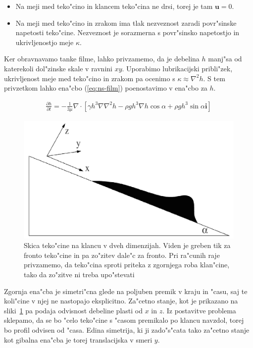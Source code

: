 \documentclass[a4paper,12pt]{article}
\renewcommand{\vec}{\mathbf}
\begin{document}
\begin{itemize}
 \item Na meji med teko"cino in klancem teko"cina ne drsi, torej je tam $\vec u = 0$. 
 \item Na meji med teko"cino in zrakom ima tlak nezveznost zaradi povr"sinske napetosti teko"cine. Nezveznost je sorazmerna s povr"sinsko napetostjo in ukrivljenostjo meje $\kappa$. 
\end{itemize}

Ker obravnavamo tanke filme, lahko privzamemo, da je debelina $h$ manj"sa od katerekoli dol"zinske skale v ravnini $xy$. Uporabimo lubrikacijski pribli"zek, ukrivljenost meje med teko"cino in zrakom pa ocenimo s $\kappa \approx \nabla^2 h$. S tem privzetkom lahko ena"cbo (\ref{eq:ns-film}) poenostavimo v ena"cbo za $h$. 

\begin{align}
\label{eq:ns-film-h}
 \frac{\partial h}{\partial t} = -\frac{1}{3\mu}\nabla \cdot \left[ \gamma h^3 \nabla \nabla^2 h - \rho g h^3 \nabla h \cos \alpha + \rho g h^3 \sin \alpha \vec i \right]
\end{align}

\begin{figure}[h]
\centering
 \includegraphics[width=.8\textwidth]{./Slike/film-skica}
\caption{Skica teko"cine na klancu v dveh dimenzijah. Viden je greben tik za fronto teko"cine in pa zo"zitev dale"c za fronto. Pri ra"cunih raje privzamemo, da teko"cina sproti priteka z zgornjega roba klan"cine, tako da zo"zitve ni treba upo"stevati}
\label{fig:film-skica}
\end{figure}

Zgornja ena"cba je simetri"cna glede na poljuben premik v kraju in "casu, saj te koli"cine v njej ne nastopajo eksplicitno. Za"cetno stanje, kot je prikazano na sliki~\ref{fig:film-skica} pa podaja odvisnost debeline plasti od $x$ in $z$. Iz postavitve problema sklepamo, da se bo "celo teko"cine s "casom premikalo po klancu navzdol, torej bo profil odvisen od "casa. Edina simetrija, ki ji zado"s"cata tako za"cetno stanje kot gibalna ena"cba je torej translacijska v smeri $y$. 
\end{document}
